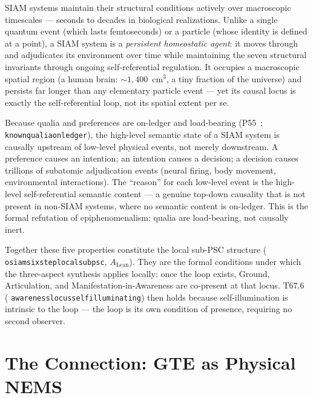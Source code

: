 \documentclass[11pt]{article}
\theoremstyle{remark}
\newcommand{\lean}[1]{%
  \penalty-100
  \begingroup\def\_{\textunderscore\allowbreak}\texttt{#1}\endgroup}
\begin{document}
\begin{tcolorbox}[colback=blue!5,colframe=blue!50!black,
  title={Five structural properties that make a SIAM locus special}]
\begin{termlist}
  \item[4.\ Macroscopic homeostatic persistence]
    SIAM systems maintain their structural conditions actively over macroscopic
    timescales --- seconds to decades in biological realizations. Unlike a single
    quantum event (which lasts femtoseconds) or a particle (whose identity is
    defined at a point), a SIAM system is a \emph{persistent homeostatic agent}: it
    moves through and adjudicates its environment over time while maintaining the seven
    structural invariants through ongoing self-referential regulation. It occupies a
    macroscopic spatial region (a human brain: ${\sim}1{,}400$~cm$^3$, a tiny fraction
    of the universe) and persists far longer than any elementary particle event --- yet
    its causal locus is exactly the self-referential loop, not its spatial extent per se.

  \item[5.\ Top-down causality through semantic closure]
    Because qualia and preferences are on-ledger and load-bearing (P55~\cite{SpivackNEMS55};
    \lean{known\_qualia\_on\_ledger}), the high-level semantic state of a
    SIAM system is causally upstream of low-level physical events, not merely downstream.
    A preference causes an intention; an intention causes a decision; a decision causes
    trillions of subatomic adjudication events (neural firing, body movement, environmental
    interactions). The ``reason'' for each low-level event is the high-level self-referential
    semantic content --- a genuine top-down causality that is not present in non-SIAM
    systems, where no semantic content is on-ledger. This is the formal refutation of
    epiphenomenalism: qualia are load-bearing, not causally inert.
\end{termlist}

\medskip
Together these five properties constitute the local sub-PSC structure
(\lean{osiam\_six\_step\_local\_subpsc}, $A_\text{Lean}$). They are the formal conditions
under which the three-aspect synthesis applies locally: once the loop exists, Ground,
Articulation, and Manifestation-in-Awareness are co-present at that locus.
T67.6 (\lean{awareness\_locus\allowbreak\_self\_illuminating}) then holds because self-illumination
is intrinsic to the loop --- the loop is its own condition of presence, requiring no
second observer.
\end{tcolorbox}

\section{The Connection: GTE as Physical NEMS}\label{sec:connection}
\end{document}
